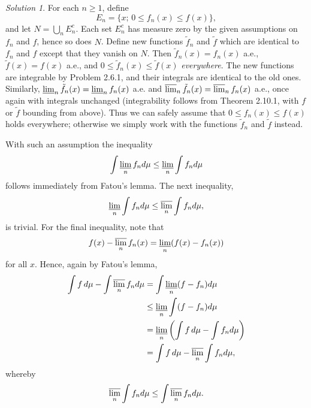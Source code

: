 \documentclass{report}
\theoremstyle{remark}
\newtheorem*{solution}{Solution}
\begin{document}
\begin{solution}
  For each $n \ge 1$, define
  \begin{equation*}
    E_n = \{x; \, 0 \le f_n(x) \le f(x)\},
  \end{equation*}
  and let $N = \bigcup_n E_n^c$. Each set $E_n^c$ has measure zero by the given assumptions on $f_n$ and $f$, hence so does $N$. Define new functions $\tilde f_n$ and $\tilde f$ which are identical to $f_n$ and $f$ except that they vanish on $N$. Then $\tilde f_n(x) = f_n(x)$ a.e., $\tilde f(x) = f(x)$ a.e., and $0 \le \tilde f_n(x) \le \tilde f(x)$ \emph{everywhere}. The new functions are integrable by Problem 2.6.1, and their integrals are identical to the old ones. Similarly, $\varliminf_n \tilde f_n(x) = \varliminf_n f_n(x)$ a.e. and $\varlimsup_n \tilde f_n(x) = \varlimsup_n f_n(x)$ a.e., once again with integrals unchanged (integrability follows from Theorem 2.10.1, with $f$ or $\tilde f$ bounding from above). Thus we can safely assume that $0 \le f_n(x) \le f(x)$ holds everywhere; otherwise we simply work with the functions $\tilde f_n$ and $\tilde f$ instead.

  With such an assumption the inequality
  \begin{equation*}
    \int \varliminf_n f_n d\mu \le \varliminf_n \int f_n d\mu
  \end{equation*}
  follows immediately from Fatou's lemma. The next inequality,
  \begin{equation*}
    \varliminf_n \int f_n d\mu \le \varlimsup_n \int f_n d\mu,
  \end{equation*}
  is trivial. For the final inequality, note that
  \begin{equation*}
    f(x) - \varlimsup_n f_n(x) = \varliminf_n (f(x) - f_n(x))
  \end{equation*}
  for all $x$. Hence, again by Fatou's lemma,
  \begin{equation*}
    \begin{split}
      \int f \, d\mu - \int \varlimsup_n f_n d\mu &= \int \varliminf_n (f - f_n) d\mu \\
      &\le \varliminf_n \int (f - f_n) d\mu \\
      &= \varliminf_n \left( \int f \, d\mu - \int f_n d\mu \right) \\
      &= \int f \, d\mu - \varlimsup_n \int f_n d\mu,
    \end{split}
  \end{equation*}
  whereby
  \begin{equation*}
    \varlimsup_n \int f_n d\mu \le \int \varlimsup_n f_n d\mu.
  \end{equation*}
\end{solution}
\end{document}

